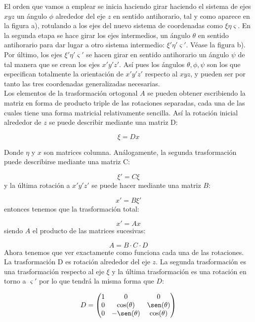 \documentclass[12pt,a4paper]{book}
\begin{document}
El orden que vamos a emplear se inicia haciendo girar haciendo el sistema de ejes $xyz$ un ángulo $\phi$ alrededor del eje $z$ en sentido antihorario, tal y como aparece en la figura a), rotulando a los ejes del nuevo sistema de coordenadas como $ \xi \eta \varsigma$. En la segunda etapa se hace girar los ejes intermedios, un ángulo $\theta$ en sentido antihorario para dar lugar a otro sistema intermedio: $\xi' \eta' \varsigma'$. Véase la figura b). Por último, los ejes $\xi' \eta' \varsigma'$ se hacen girar en sentido antihorario un ángulo $\psi$ de tal manera que se crean los ejes $x'y'z'$. Así pues los ángulos $\theta, \phi, \psi$ son los que especifican totalmente la orientación de $x'y'z'$ respecto al $xyz$, y pueden ser por tanto las tres coordenadas generalizadas necesarias. \\

Los elementos de la trasformación ortogonal $A$ se pueden obtener escribiendo la matriz en forma de producto triple de las rotaciones separadas, cada una de las cuales tiene una forma matricial relativamente sencilla. Así la rotación inicial alrededor de $z$ se puede describir mediante una matriz D:

$$ \xi = D x $$

Donde $\eta$ y $x$ son matrices columna. Análogamente, la segunda trasformación puede describirse mediante una matriz C:

$$ \xi ' = C \xi $$
y la última rotación a $x'y'z'$ se puede hacer mediante una matriz $B$:

$$ x' = B \xi' $$
entonces tenemos que la trasformación total:

$$ x' = A x $$
siendo $A$ el producto de las matrices sucesivas:

\begin{equation}
A = B \cdot C \cdot D
\end{equation}
Ahora tenemos que ver exactamente como funciona cada una de las rotaciones. La trasformación D es rotación alrededor del eje $z$. La segunda trasformación es una trasformación respecto al eje $\xi$ y la última trasformación es una rotación en torno a $\varsigma'$ por lo que tendrá la misma forma que $D$:

\begin{equation}
D = \begin{pmatrix}
1 &
0 &
0 \\ 
0 &
\cos(\theta) &
\sen(\theta) \\ 
0 &
-\sen(\theta) &
\cos(\theta) \\ 
\end{pmatrix}
\end{equation}
\end{document}
